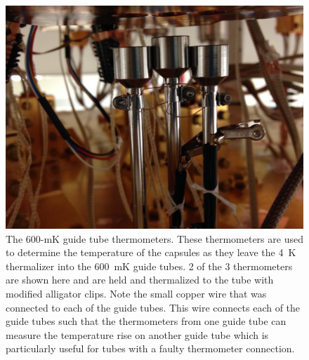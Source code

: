 \begin{figure}[htbp]
    \centering
    \includegraphics[width=0.8\linewidth]{Figures/ChicaneThermometers.JPG}
    \caption[The 600-mK guide tube thermometers]
{The 600-mK guide tube thermometers.
These thermometers are used to determine the temperature of the capsules as they leave the 4~K thermalizer into the 600~mK guide tubes.
2 of the 3 thermometers are shown here and are held and thermalized to the tube with modified alligator clips.
Note the small copper wire that was connected to each of the guide tubes.
This wire connects each of the guide tubes such that the thermometers from one guide tube can measure the temperature rise on another guide tube which is particularly useful for tubes with a faulty thermometer connection.}
    \label{fig:600mK_thermometers}
\end{figure}


